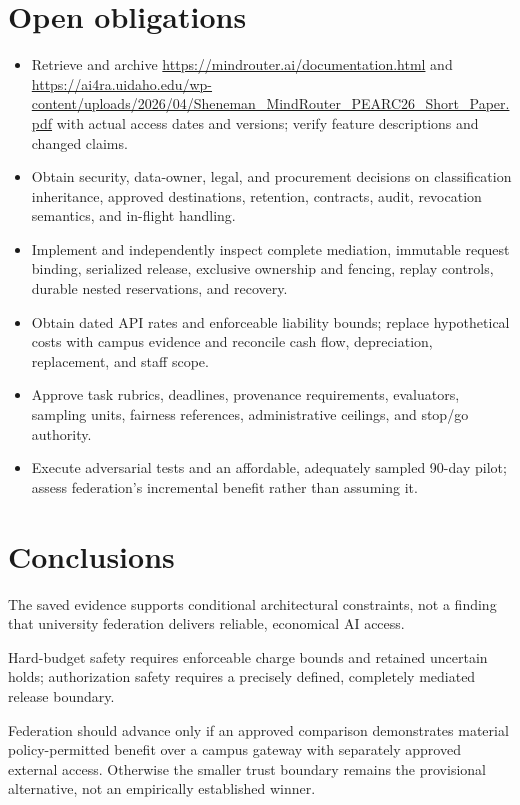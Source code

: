 \documentclass[11pt]{article}
\begin{document}
\section{Open obligations}
\begin{itemize}
\item Retrieve and archive \url{https://mindrouter.ai/documentation.html} and \url{https://ai4ra.uidaho.edu/wp-content/uploads/2026/04/Sheneman_MindRouter_PEARC26_Short_Paper.pdf} with actual access dates and versions; verify feature descriptions and changed claims.
\item Obtain security, data-owner, legal, and procurement decisions on classification inheritance, approved destinations, retention, contracts, audit, revocation semantics, and in-flight handling.
\item Implement and independently inspect complete mediation, immutable request binding, serialized release, exclusive ownership and fencing, replay controls, durable nested reservations, and recovery.
\item Obtain dated API rates and enforceable liability bounds; replace hypothetical costs with campus evidence and reconcile cash flow, depreciation, replacement, and staff scope.
\item Approve task rubrics, deadlines, provenance requirements, evaluators, sampling units, fairness references, administrative ceilings, and stop/go authority.
\item Execute adversarial tests and an affordable, adequately sampled 90-day pilot; assess federation's incremental benefit rather than assuming it.
\end{itemize}
\section{Conclusions}
The saved evidence supports conditional architectural constraints, not a finding that university federation delivers reliable, economical AI access.

Hard-budget safety requires enforceable charge bounds and retained uncertain holds; authorization safety requires a precisely defined, completely mediated release boundary.

Federation should advance only if an approved comparison demonstrates material policy-permitted benefit over a campus gateway with separately approved external access. Otherwise the smaller trust boundary remains the provisional alternative, not an empirically established winner.
\end{document}
